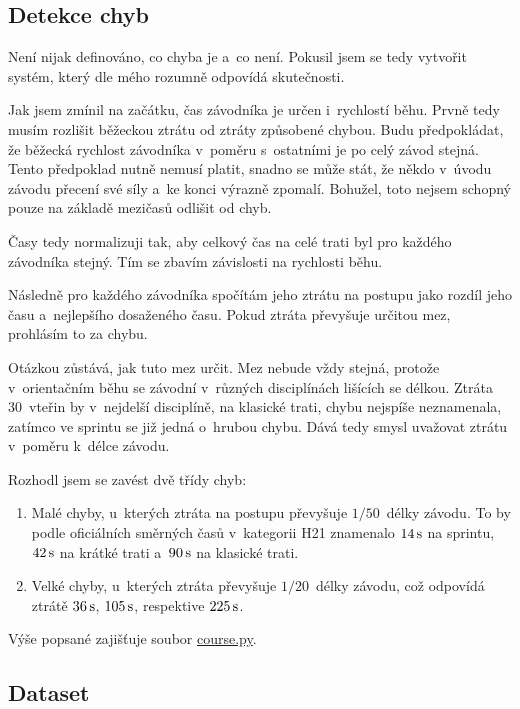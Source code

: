 \documentclass[a4paper,11pt]{article}
\begin{document}
\subsection*{Detekce chyb}

Není nijak definováno, co chyba je a~co není. Pokusil jsem se tedy vytvořit
systém, který dle mého rozumně odpovídá skutečnosti.

Jak jsem zmínil na začátku, čas závodníka je určen i~rychlostí běhu. Prvně tedy
musím rozlišit běžeckou ztrátu od ztráty způsobené chybou. Budu předpokládat, že
běžecká rychlost závodníka v~poměru s~ostatními je po celý závod stejná.
Tento předpoklad nutně nemusí platit, snadno se může stát, že někdo v~úvodu
závodu přecení své síly a~ke konci výrazně zpomalí. Bohužel, toto nejsem schopný
pouze na základě mezičasů odlišit od chyb.

Časy tedy normalizuji tak, aby celkový čas na celé trati byl pro každého
závodníka stejný. Tím se zbavím závislosti na rychlosti běhu.

Následně pro každého závodníka spočítám jeho ztrátu na postupu jako rozdíl jeho
času a~nejlepšího dosaženého času. Pokud ztráta převyšuje určitou mez, prohlásím
to za chybu.

Otázkou zůstává, jak tuto mez určit. Mez nebude vždy stejná, protože
v~orientačním běhu se závodní v~různých disciplínách lišících se délkou. Ztráta
30~vteřin by v~nejdelší disciplíně, na klasické trati, chybu nejspíše
neznamenala, zatímco ve sprintu se již jedná o~hrubou chybu. Dává tedy smysl
uvažovat ztrátu v~poměru k~délce závodu.

Rozhodl jsem se zavést dvě třídy chyb:
\begin{enumerate}
    \item Malé chyby, u~kterých ztráta na postupu převyšuje $1/50$~délky závodu.
          To by podle oficiálních směrných časů v~kategorii H21 znamenalo $14\,\rm s$
          na sprintu, $42\,\rm s$ na krátké trati a~$90\,\rm s$ na klasické trati.
    \item Velké chyby, u~kterých ztráta převyšuje $1/20$~délky závodu, což
          odpovídá ztrátě $36\,\rm s$, $105\,\rm s$, respektive $225\,\rm s$.
\end{enumerate}

Výše popsané zajišťuje soubor
\href{https://github.com/kulisak12/mistake-stats/blob/main/course.py}{course.py}.

\subsection*{Dataset}
\end{document}
